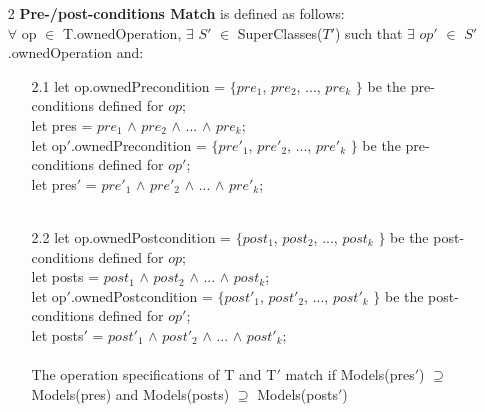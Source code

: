 \begin{definition}
\begin{enumerate}
\item[2] \textbf{Pre-/post-conditions Match} is defined as follows:\\
$\forall$ op $\in$ T.ownedOperation, $\exists$ $S'$ $\in$ SuperClasses($T'$) such that $\exists$ $op'$ $\in$ $S'$.ownedOperation and:\\
	\begin{enumerate}
		\item[2.1] 
		let op.ownedPrecondition = $\{$$pre_{1}$, $pre_{2}$, ..., $pre_{k}$ $\}$ be the pre-conditions defined for $op$;\\
		let pres = $pre_{1}$ $\wedge$ $pre_{2}$ $\wedge$ ... $\wedge$ $pre_{k}$;\\
		let op$'$.ownedPrecondition = $\{$$pre'_{1}$, $pre'_{2}$, ..., $pre'_{k}$ $\}$ be the pre-conditions defined for $op'$;\\
		let pres$'$ = $pre'_{1}$ $\wedge$ $pre'_{2}$ $\wedge$ ... $\wedge$ $pre'_{k}$;\\
		\\
		
		
		\item[2.2] 
		let op.ownedPostcondition = $\{$$post_{1}$, $post_{2}$, ..., $post_{k}$ $\}$ be the post-conditions defined for $op$;\\
		let posts = $post_{1}$ $\wedge$ $post_{2}$ $\wedge$ ... $\wedge$ $post_{k}$;\\
		let op$'$.ownedPostcondition = $\{$$post'_{1}$, $post'_{2}$, ..., $post'_{k}$ $\}$ be the post-conditions defined for $op'$;\\
		let posts$'$ = $post'_{1}$ $\wedge$ $post'_{2}$ $\wedge$ ... $\wedge$ $post'_{k}$;\\
		\\
		The operation specifications of T and T$'$ match if Models(pres$'$) $\supseteq$ Models(pres) and Models(posts) $\supseteq$ Models(posts$'$)
		

\end{enumerate}
\end{enumerate}
\end{definition}
